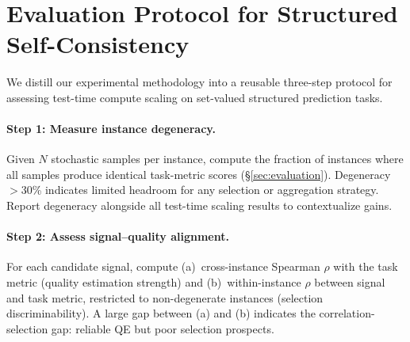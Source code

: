 \begin{table}[t]
\centering
\caption{Full zero-shot vs.\ few-shot comparison for Qwen2.5-72B-Instruct-AWQ ($N{=}8$). Only SciERC under zero-shot yields a significant construction gain.}
\label{tab:72b_zs_vs_fs}
\end{table}

\section{Evaluation Protocol for Structured Self-Consistency}\label{app:eval_protocol}

We distill our experimental methodology into a reusable three-step protocol for assessing test-time compute scaling on set-valued structured prediction tasks.

\paragraph{Step 1: Measure instance degeneracy.}
Given $N$ stochastic samples per instance, compute the fraction of instances where all samples produce identical task-metric scores (\S\ref{sec:evaluation}).
Degeneracy ${>}30$\% indicates limited headroom for any selection or aggregation strategy.
Report degeneracy alongside all test-time scaling results to contextualize gains.

\paragraph{Step 2: Assess signal--quality alignment.}
For each candidate signal, compute (a)~cross-instance Spearman $\rho$ with the task metric (quality estimation strength) and (b)~within-instance $\rho$ between signal and task metric, restricted to non-degenerate instances (selection discriminability).
A large gap between (a) and (b) indicates the correlation-selection gap: reliable QE but poor selection prospects.

